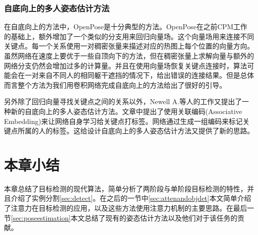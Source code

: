 \subsubsection{自底向上的多人姿态估计方法}
\label{subsubsec:bottomuppose}
在自底向上的方法中，OpenPose\cite{Cao2016Realtime}是十分典型的方法。OpenPose在之前CPM工作的基础上，额外增加了一个类似的分支用来回归向量场。这个向量场用来连接不同关键点。每一个关系使用一对稠密张量来描述对应的热图上每个位置的向量方向。虽然网络在速度上要优于一些自顶向下的方法，但在稠密张量上求解向量与额外的网络分支仍然会增加过多的计算量。并且在使用向量场恢复关键点连接时，算法可能会在一对来自不同人的相同躯干遮挡的情况下，给出错误的连接结果。但是总体而言整个方法为我们用卷积网络完成自底向上的方法给出了很好的引导。

另外除了回归向量寻找关键点之间的关系以外，Newell A.\cite{Newell2017Associative}等人的工作又提出了一种新的自底向上的多人姿态估计方法。文章中提出了使用关联编码(Associative Embedding)来让网络自身学习给关键点打标签。网络通过生成一组编码来标记关键点所属的人的标签。这给设计自底向上的多人姿态估计方法又提供了新的思路。


\section{本章小结}
本章总结了目标检测的现代算法，简单分析了两阶段与单阶段目标检测的特性，并且介绍了实例分割\ref{sec:detect}。在之后的一节中\ref{sec:attenandobjdet}本文简单介绍了注意力在目标检测的应用，以及这些方法使用注意力机制的主要思路。在最后一节\ref{sec:poseestimation}本文总结了现有的姿态估计方法以及他们对于该任务的贡献。
